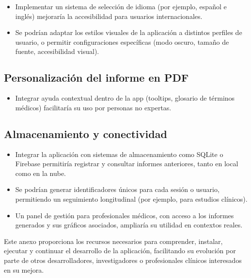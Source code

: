 \begin{itemize}
    \item Implementar un sistema de selección de idioma (por ejemplo, español e inglés) mejoraría la accesibilidad para usuarios internacionales.
    \item Se podrían adaptar los estilos visuales de la aplicación a distintos perfiles de usuario, o permitir configuraciones específicas (modo oscuro, tamaño de fuente, accesibilidad visual).

\end{itemize}


\subsection{Personalización del informe en PDF }

    \begin{itemize}
        \item Integrar ayuda contextual dentro de la app (tooltips, glosario de términos médicos) facilitaría su uso por personas no expertas. 
    \end{itemize}


    \subsection{Almacenamiento y conectividad}
    \begin{itemize}
    \item Integrar la aplicación con sistemas de almacenamiento como SQLite o Firebase permitiría registrar y consultar informes anteriores, tanto en local como en la nube.
    \item Se podrían generar identificadores únicos para cada sesión o usuario, permitiendo un seguimiento longitudinal (por ejemplo, para estudios clínicos).
    \item Un panel de gestión para profesionales médicos, con acceso a los informes generados y sus gráficos asociados, ampliaría su utilidad en contextos reales. 
    \end{itemize}


Este anexo proporciona los recursos necesarios para comprender, instalar, ejecutar y continuar el desarrollo de la aplicación, facilitando su evolución por parte de otros desarrolladores, investigadores o profesionales clínicos interesados en su mejora.
